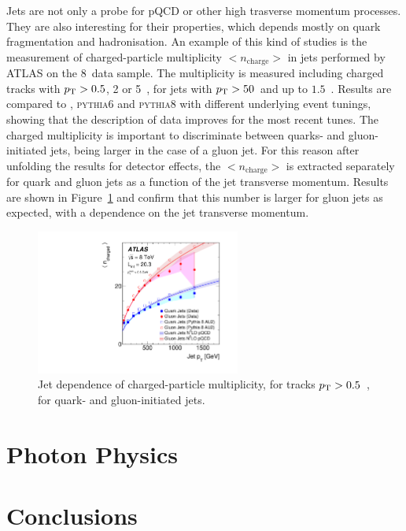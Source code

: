 \documentclass{PoS}
\providecommand{\PYTHIAS} {{\textsc{pythia6}}\xspace}
\providecommand{\PYTHIAE} {{\textsc{pythia8}}\xspace}
\begin{document}
Jets are not only a probe for pQCD or other high trasverse momentum processes. They are also interesting for their
properties, which depends mostly on quark fragmentation and hadronisation. An example of this kind of studies is the
measurement of charged-particle multiplicity $<n_\mathrm{charge}>$ in jets performed by ATLAS on the 8~\TeV data sample\cite{Aad:2016oit}.
The multiplicity is measured including charged tracks with $p_{\mathrm{T}} > 0.5$, 2 or 5~\GeV, for jets with $p_{\mathrm{T}} > 50$~\GeV and up to
$1.5$~\TeV. Results are compared to \HERWIGpp, \PYTHIAS and \PYTHIAE with different underlying event tunings, showing
that the description of data improves for the most recent tunes. 
The charged multiplicity is important to discriminate between quarks- and gluon-initiated jets, being larger in the case
of a gluon jet. For this reason after unfolding the results for detector effects, the  $<n_\mathrm{charge}>$ is
extracted separately for quark and gluon jets as a function of the jet transverse momentum. Results are shown in
Figure~\ref{fig:chargemult} and confirm that this number is larger for gluon jets as expected, with a dependence on the jet transverse
momentum.

\begin{figure}[hbtp]
  \centering
  \includegraphics[width=0.6\textwidth]{Figure9.pdf}
  \caption{Jet \pt dependence of charged-particle multiplicity, for tracks $p_{\mathrm{T}} > 0.5$~\GeV, for quark- and
    gluon-initiated jets.}
  \label{fig:chargemult}
\end{figure}


\section{Photon Physics}

\section{Conclusions}
\end{document}

